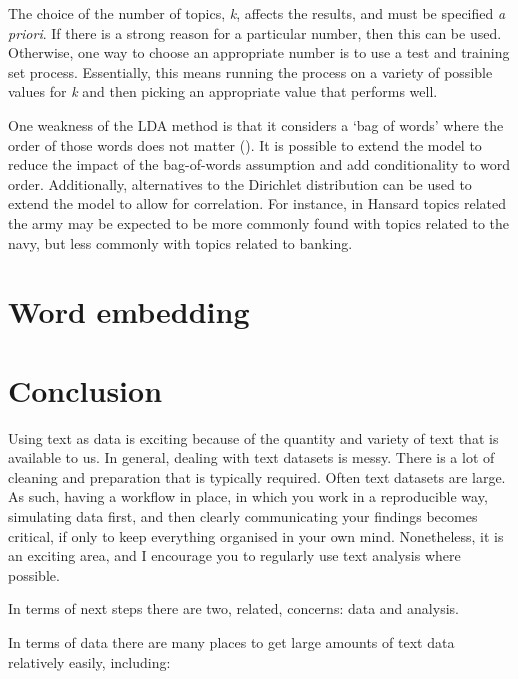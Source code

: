\documentclass[
]{book}
\begin{document}
The choice of the number of topics, \emph{k}, affects the results, and must be specified \emph{a priori}. If there is a strong reason for a particular number, then this can be used. Otherwise, one way to choose an appropriate number is to use a test and training set process. Essentially, this means running the process on a variety of possible values for \emph{k} and then picking an appropriate value that performs well.

One weakness of the LDA method is that it considers a `bag of words' where the order of those words does not matter (\citet{blei2012}). It is possible to extend the model to reduce the impact of the bag-of-words assumption and add conditionality to word order. Additionally, alternatives to the Dirichlet distribution can be used to extend the model to allow for correlation. For instance, in Hansard topics related the army may be expected to be more commonly found with topics related to the navy, but less commonly with topics related to banking.

\hypertarget{word-embedding}{%
\section{Word embedding}\label{word-embedding}}

\hypertarget{conclusion-1}{%
\section{Conclusion}\label{conclusion-1}}

Using text as data is exciting because of the quantity and variety of text that is available to us. In general, dealing with text datasets is messy. There is a lot of cleaning and preparation that is typically required. Often text datasets are large. As such, having a workflow in place, in which you work in a reproducible way, simulating data first, and then clearly communicating your findings becomes critical, if only to keep everything organised in your own mind. Nonetheless, it is an exciting area, and I encourage you to regularly use text analysis where possible.

In terms of next steps there are two, related, concerns: data and analysis.

In terms of data there are many places to get large amounts of text data relatively easily, including:
\end{document}
